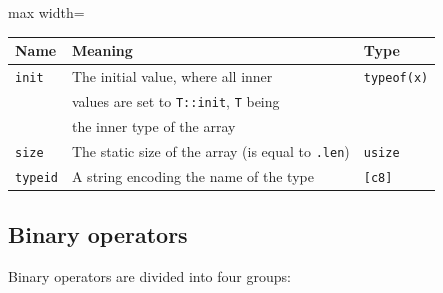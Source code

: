 \begin{center}\begin{adjustbox}{max width=\linewidth}
  \begin{tabular}{|l|ll|}
    \hline
    Name & Meaning & Type\\
    \hline
    \hline
    \texttt{init} & The initial value, where all inner & \texttt{typeof(x)} \\
    & values are set to \texttt{T::init}, \texttt{T} being & \\
    & the inner type of the array & \\
    \Xhline{0.001pt}
    \texttt{size} & The static size of the array (is equal to \texttt{.len}) & \texttt{usize} \\
    \hline
    \texttt{typeid} & A string encoding the name of the type & \texttt{[c8]} \\
    \hline
  \end{tabular}
\end{adjustbox}\end{center}

\subsection {Binary operators}

Binary operators are divided into four groups:

